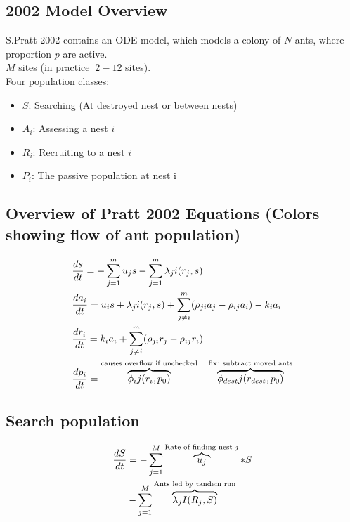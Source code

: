 \documentclass[letterpaper]{article}
\makeatletter
\def\mcolor#1#{\@mcolor{#1}}
\def\@mcolor#1#2#3{%
  \protect\leavevmode
  \begingroup
    \color#1{#2}#3%
  \endgroup
}
\newcommand{\annotate}[3]{
\mcolor{#1}{\overbrace{#3}^\text{#2}}
}
\makeatother
\begin{document}
  \subsection{2002 Model Overview}
  S.Pratt 2002 contains an ODE model, which models a colony of $N$ ants, where proportion $p$ are active. \\
      $M$ sites (in practice $~2-12$ sites). \\
      Four population classes: 
      \begin{itemize}
          \item $S$: Searching (At destroyed nest or between nests) 
          \item $A_i$: Assessing a nest $i$ 
          \item $R_i$: Recruiting to a nest $i$ 
          \item $P_i$: The passive population at nest i 
      \end{itemize}

  \subsection{Overview of Pratt 2002 Equations (Colors showing flow of ant population)}
      \Large
      \begin{equation}
      \begin{aligned}
          & \frac{ds}{dt} = - \sum_{j=1}^m \mcolor{black}{u_js} - \sum_{j=1}^m \mcolor{black}{\lambda_ji(r_j, s)} \\
          & \frac{da_i}{dt} = \mcolor{black}{u_is} + \mcolor{black}{\lambda_ji(r_j, s)} + \sum_{j \neq i}^m \mcolor{black}{(\rho_{ji}a_j - \rho_{ij}a_i)} - \mcolor{black}{k_ia_i} \\
          & \frac{dr_i}{dt} = \mcolor{black}{k_ia_i} + \sum_{j \neq i}^m \mcolor{black}{(\rho_{ji}r_j - \rho_{ij}r_i)} \\
          & \frac{dp_i}{dt} = \annotate{black}{causes overflow if unchecked}{\phi_ij(r_i, p_0)} - \annotate{black}{fix: subtract moved ants}{\phi_{dest}j(r_{dest},p_0)}
      \end{aligned}
      \end{equation}
  \subsection{Search population}
      \Large
      \begin{multline}
      \frac{dS}{dt} = - \sum_{j=1}^M \annotate{black}{Rate of finding nest $j$}{u_j}*S \\  
      - \sum_{j=1}^M \annotate{black}{Ants led by tandem run}{\lambda_jI(R_j, S)} 
      \end{multline}
\end{document}
